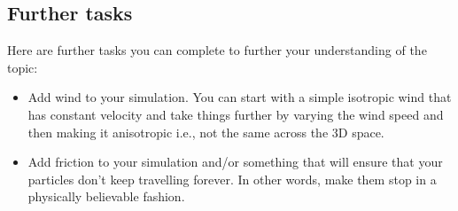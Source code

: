 \documentclass[12pt]{article}
\begin{document}
\subsection*{Further tasks}

Here are further tasks you can complete to further your understanding of the topic:

\begin{itemize}
\item Add wind to your simulation. You can start with a simple isotropic wind that has constant velocity and take things further by varying the wind speed and then making it anisotropic i.e., not the same across the 3D space.
\item Add friction to your simulation and/or something that will ensure that your particles don't keep travelling forever. In other words, make them stop in a physically believable fashion.
\end{itemize}


\end{document}
